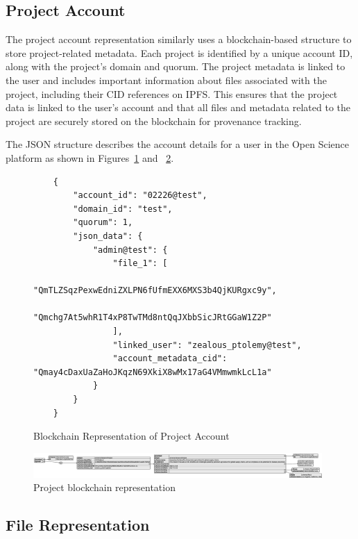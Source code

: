 \documentclass{article}
\begin{document}
\subsection{Project Account}

The project account representation similarly uses a blockchain-based structure to store project-related metadata. Each project is identified by a unique account ID, along with the project’s domain and quorum. The project metadata is linked to the user and includes important information about files associated with the project, including their CID references on IPFS. This ensures that the project data is linked to the user’s account and that all files and metadata related to the project are securely stored on the blockchain for provenance tracking.

The JSON structure describes the account details for a user in the Open Science platform as shown in Figures~\ref{fig:project_blockchain_representation} and ~\ref{fig:project_bct_rep}.


\begin{figure}[h]
      \centering
      \caption{Blockchain Representation of Project Account}
      \label{fig:project_blockchain_representation}
      \begin{verbatim}
    {
        "account_id": "02226@test",
        "domain_id": "test",
        "quorum": 1,
        "json_data": {
            "admin@test": {
                "file_1": [
                    "QmTLZSqzPexwEdniZXLPN6fUfmEXX6MXS3b4QjKURgxc9y",
                    "Qmchg7At5whR1T4xP8TwTMd8ntQqJXbbSicJRtGGaW1Z2P"
                ],
                "linked_user": "zealous_ptolemy@test",
                "account_metadata_cid": "Qmay4cDaxUaZaHoJKqzN69XkiX8wMx17aG4VMmwmkLcL1a"
            }
        }
    }
    \end{verbatim}
\end{figure}


\begin{figure}[htbp]
      \centering
      \includegraphics[width=0.98\textwidth, keepaspectratio]{project_bct_representation.eps}
      \caption{Project blockchain representation}
      \label{fig:project_bct_rep}
\end{figure}


\subsection*{File Representation}
\end{document}
